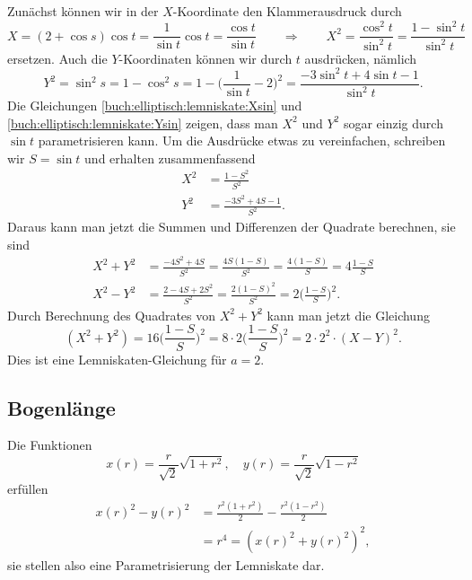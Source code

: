 Zunächst können wir in der $X$-Koordinate den Klammerausdruck durch 
\begin{equation}
X
=
(2+\cos s) \cos t
=
\frac{1}{\sin t}\cos t
=
\frac{\cos t}{\sin t}
\qquad\Rightarrow\qquad
X^2
=
\frac{\cos^2t}{\sin^2 t}
=
\frac{1-\sin^2t}{\sin^2 t}
\label{buch:elliptisch:lemniskate:Xsin}
\end{equation}
ersetzen.
Auch die $Y$-Koordinaten können wir durch $t$ ausdrücken, 
nämlich
\begin{equation}
Y^2=\sin^2 s = 1-\cos^2 s
=
1-
\biggl(
\frac{1}{\sin t}
-2
\biggr)^2
=
\frac{-3\sin^2 t+4\sin t-1}{\sin^2 t}.
\label{buch:elliptisch:lemniskate:Ysin}
\end{equation}
Die Gleichungen
\eqref{buch:elliptisch:lemniskate:Xsin}
und
\eqref{buch:elliptisch:lemniskate:Ysin}
zeigen, dass man $X^2$ und $Y^2$ sogar einzig durch $\sin t$ 
parametrisieren kann.
Um die Ausdrücke etwas zu vereinfachen, schreiben wir $S=\sin t$
und erhalten zusammenfassend
\begin{equation}
\begin{aligned}
X^2
&=
\frac{1-S^2}{S^2}
\\
Y^2
&=
\frac{-3S^2+4S-1}{S^2}.
\end{aligned}
\end{equation}
Daraus kann man jetzt die Summen und Differenzen der Quadrate
berechnen, sie sind
\begin{equation}
\begin{aligned}
X^2+Y^2
&=
\frac{-4S^2+4S}{S^2}
=
\frac{4S(1-S)}{S^2}
=
\frac{4(1-S)}{S}
=
4\frac{1-S}{S}
\\
X^2-Y^2
&=
\frac{2-4S+2S^2}{S^2}
=
\frac{2(1-S)^2}{S^2}
=
2\biggl(\frac{1-S}{S}\biggr)^2.
\end{aligned}
\end{equation}
Durch Berechnung des Quadrates von $X^2+Y^2$ kann man jetzt
die Gleichung
\[
(X^2+Y^2)
=
16
\biggl(\frac{1-S}{S}\biggr)^2
=
8 \cdot 2
\biggl(\frac{1-S}{S}\biggr)^2
=
2\cdot 2^2\cdot (X-Y)^2.
\]
Dies ist eine Lemniskaten-Gleichung für $a=2$.

%
%
\subsection{Bogenlänge}
Die Funktionen
\begin{equation}
x(r) = \frac{r}{\sqrt{2}}\sqrt{1+r^2},
\quad
y(r) = \frac{r}{\sqrt{2}}\sqrt{1-r^2}
\label{buch:geometrie:eqn:lemniskateparam}
\end{equation}
erfüllen
\begin{align*}
x(r)^2-y(r)^2
&=
\frac{r^2(1+r^2)}{2}-\frac{r^2(1-r^2)}{2}
\\
&
=
r^4
=
(x(r)^2 + y(r)^2)^2,
\end{align*}
sie stellen also eine Parametrisierung der Lemniskate dar.

